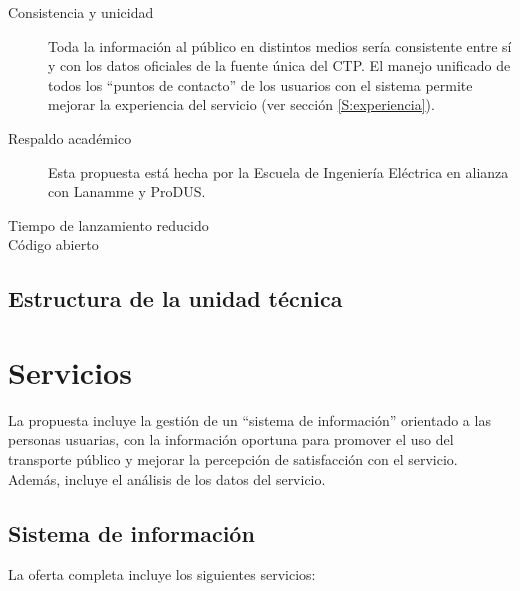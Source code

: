 \documentclass{report}
\begin{document}
\begin{description}
    \item[Consistencia y unicidad] Toda la información al público en distintos medios sería consistente entre sí y con los datos oficiales de la fuente única del CTP. El manejo unificado de todos los ``puntos de contacto'' de los usuarios con el sistema permite mejorar la experiencia del servicio (ver sección \ref{S:experiencia}).

    \item[Respaldo académico] Esta propuesta está hecha por la Escuela de Ingeniería Eléctrica en alianza con Lanamme y ProDUS.

    \item[Tiempo de lanzamiento reducido] 

    \item[Código abierto] 
    
\end{description}

\section{Estructura de la unidad técnica}
\label{S:estructura}

\chapter{Servicios}

La propuesta incluye la gestión de un ``sistema de información'' orientado a las personas usuarias, con la información oportuna para promover el uso del transporte público y mejorar la percepción de satisfacción con el servicio. Además, incluye el análisis de los datos del servicio.

\section{Sistema de información}

La oferta completa incluye los siguientes servicios:
\end{document}
